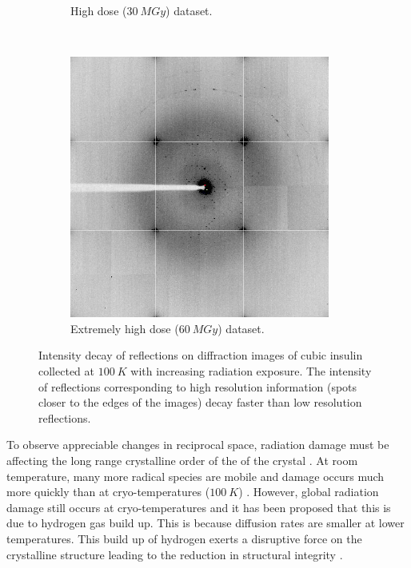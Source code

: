 \begin{figure}
\begin{subfigure}[b]{0.45\textwidth}
                    \caption{High dose ($30\ MGy$) dataset.}
                    \label{fig:Intensity decay insulin diffraction image 30MGy}
            \end{subfigure}
            \\
            \begin{subfigure}[b]{0.45\textwidth}
                    \centering
                    \includegraphics[width=\textwidth]{figures/introduction/intensityloss_60MGy.png}
                    \caption{Extremely high dose ($60\ MGy$) dataset.}
                    \label{fig:Intensity decay insulin diffraction image 60MGy}
            \end{subfigure}
            \caption{Intensity decay of reflections on diffraction images of cubic insulin collected at $100\ K$ with increasing radiation exposure. The intensity of reflections corresponding to high resolution information (spots closer to the edges of the images) decay faster than low resolution reflections.}
            \label{fig:Intensity decay insulin diffraction images}
        \end{figure}

        To observe appreciable changes in reciprocal space, radiation damage must be affecting the long range crystalline order of the of the crystal \cite{meents2010}.
        At room temperature, many more radical species are mobile and damage occurs much more quickly than at cryo-temperatures ($100\ K$) \cite{henderson1990cryo,weik2010temperature}.
        However, global radiation damage still occurs at cryo-temperatures and it has been proposed that this is due to hydrogen gas build up. 
		This is because diffusion rates are smaller at lower temperatures. 
		This build up of hydrogen exerts a disruptive force on the crystalline structure leading to the reduction in structural integrity \cite{meents2010}.

